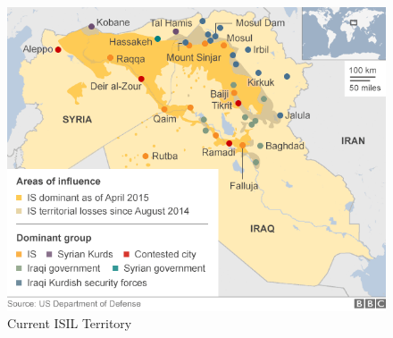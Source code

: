 \documentclass{report}
\begin{document}
% 








\begin{figure}[H]
 \centering
 \includegraphics[trim = 0cm 0cm 0cm 0cm, clip,scale=0.5]{./figures/current_territory.png}
   \caption{Current ISIL Territory \cite{BBC2015a}}
     \label{fig:current_territory}
\end{figure}
\end{document}
